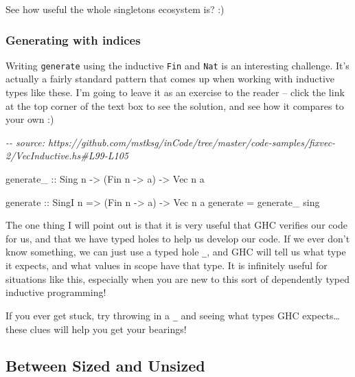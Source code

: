 \documentclass[]{article}
\newenvironment{Shaded}{}{}
\newcommand{\CommentTok}[1]{\textcolor[rgb]{0.38,0.63,0.69}{\textit{#1}}}
\newcommand{\DataTypeTok}[1]{\textcolor[rgb]{0.56,0.13,0.00}{#1}}
\newcommand{\NormalTok}[1]{#1}
\newcommand{\OtherTok}[1]{\textcolor[rgb]{0.00,0.44,0.13}{#1}}
\begin{document}
See how useful the whole singletons ecosystem is? :)

\hypertarget{generating-with-indices-1}{%
\subsubsection{Generating with indices}\label{generating-with-indices-1}}

Writing \texttt{generate} using the inductive \texttt{Fin} and \texttt{Nat} is
an interesting challenge. It's actually a fairly standard pattern that comes up
when working with inductive types like these. I'm going to leave it as an
exercise to the reader -- click the link at the top corner of the text box to
see the solution, and see how it compares to your own :)

\begin{Shaded}
\begin{Highlighting}[]
\CommentTok{{-}{-} source: https://github.com/mstksg/inCode/tree/master/code{-}samples/fixvec{-}2/VecInductive.hs\#L99{-}L105}

\OtherTok{generate\_ ::} \DataTypeTok{Sing}\NormalTok{ n }\OtherTok{{-}>}\NormalTok{ (}\DataTypeTok{Fin}\NormalTok{ n }\OtherTok{{-}>}\NormalTok{ a) }\OtherTok{{-}>} \DataTypeTok{Vec}\NormalTok{ n a}

\OtherTok{generate ::} \DataTypeTok{SingI}\NormalTok{ n }\OtherTok{=>}\NormalTok{ (}\DataTypeTok{Fin}\NormalTok{ n }\OtherTok{{-}>}\NormalTok{ a) }\OtherTok{{-}>} \DataTypeTok{Vec}\NormalTok{ n a}
\NormalTok{generate }\OtherTok{=}\NormalTok{ generate\_ sing}
\end{Highlighting}
\end{Shaded}

The one thing I will point out is that it is very useful that GHC verifies our
code for us, and that we have typed holes to help us develop our code. If we
ever don't know something, we can just use a typed hole \texttt{\_}, and GHC
will tell us what type it expects, and what values in scope have that type. It
is infinitely useful for situations like this, especially when you are new to
this sort of dependently typed inductive programming!

If you ever get stuck, try throwing in a \texttt{\_} and seeing what types GHC
expects\ldots these clues will help you get your bearings!

\hypertarget{between-sized-and-unsized}{%
\subsection{Between Sized and Unsized}\label{between-sized-and-unsized}}
\end{document}
